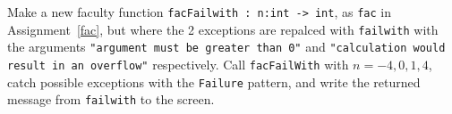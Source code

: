 Make a new faculty function \lstinline{facFailwith : n:int -> int}, as \lstinline{fac} in Assignment~\ref{fac}, but where the 2 exceptions are repalced with \lstinline{failwith} with the arguments \lstinline{"argument must be greater than 0"} and \lstinline{"calculation would result in an overflow"} respectively. Call \lstinline{facFailWith} with $n=-4,0,1,4$, catch possible exceptions with the \lstinline{Failure} pattern, and write the returned message from \lstinline{failwith} to the screen.